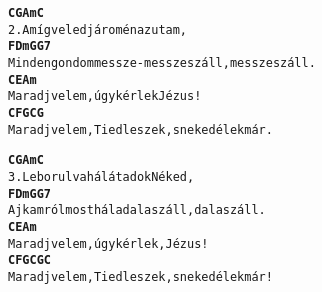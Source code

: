 \newpage
{}
\kottastart
{}
\kottaend
\begin{minipage}{\textwidth}
\begin{alltt}
\textbf{   C          G           Am   C}
2. Amíg veled járom én az utam,
\textbf{    F             Dm             G             G7}
   Minden gondom messze-messze száll, messze száll.
\textbf{    C            E           Am}
   Maradj velem, úgy kérlek Jézus!
\textbf{    C             F              G          C  G}
   Maradj velem, Tied leszek, s neked élek már.
\end{alltt}
\vspace{0.0cm}
\versszakspacing
\end{minipage}
\begin{minipage}{\textwidth}
\begin{alltt}
\textbf{   C          G          Am   C}
3. Leborulva hálát adok Néked,
\textbf{   F             Dm          G           G7}
   Ajkamról most hála dala száll, dala száll.
\textbf{    C            E            Am}
   Maradj velem, úgy kérlek, Jézus!
\textbf{    C             F              G          C  G  C}
   Maradj velem, Tied leszek, s neked élek már!
\end{alltt}
\vspace{0.0cm}
\versszakspacing
\end{minipage}
